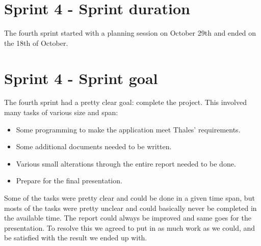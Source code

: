 \section{Sprint 4 - Sprint duration}
The fourth sprint started with a planning session on October 29th and ended on the 18th of October.  
\newline

\section{Sprint 4 - Sprint goal}
The fourth sprint had a pretty clear goal: complete the project. This involved many tasks of various size and span:


\begin{itemize}
\item{}Some programming to make the application meet Thales’ requirements.
\item{}Some additional documents needed to be written.
\item{}Various small alterations through the entire report needed to be done.
\item{}Prepare for the final presentation.
\end{itemize}

Some of the tasks were pretty clear and could be done in a given time span, but mosts of the tasks were pretty unclear and could basically never be completed in the available time. The report could always be improved and same goes for the presentation. To resolve this we agreed to put in as much work as we could, and be satisfied with the result we ended up with. 

